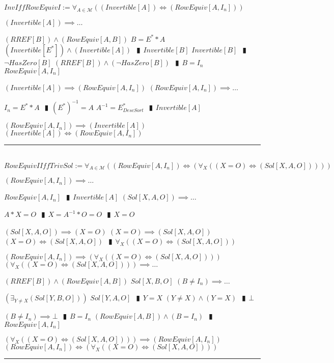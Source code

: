 \documentclass{book}
\newcommand{\abr}{:=}
\newcommand{\pipe}{$\phantom{(}\vrectangleblack\phantom{)}$}
\newcommand{\pr}[1]{\left(#1\right)}
\begin{document}
$InvIffRowEquivI \abr \forall_{A \in \mathcal{M}}\pr{(Invertible[A]) \iff (RowEquiv[A, I_n])}$
\begin{enumerate}
  \lit $(Invertible[A]) \implies \ldots$
  \begin{enumerate}
    \lit $(RREF[B]) \land (RowEquiv[A, B])$
    \lit $B = E^* * A$
    \lit $(Invertible[E^*]) \land (Invertible[A])$ \pipe $Invertible[B]$
    \lit $Invertible[B]$ \pipe $\lnot HasZero[B]$
    \lit $(RREF[B]) \land (\lnot HasZero[B])$ \pipe $B = I_n$
    \lit $RowEquiv[A, I_n]$
  \end{enumerate}
  \lit $(Invertible[A]) \implies (RowEquiv[A, I_n])$
  \lit $(RowEquiv[A, I_n]) \implies \ldots$
  \begin{enumerate}
    \lit $I_n = E^* * A$ \pipe $(E^*)^{-1} = A$
    \lit $A^{-1} = E^*_{DescSort}$ \pipe $Invertible[A]$
  \end{enumerate}
  \lit $(RowEquiv[A, I_n]) \implies (Invertible[A])$
  \lit $(Invertible[A]) \iff (RowEquiv[A, I_n])$
\end{enumerate} \vspace{.75mm} \hrule \vspace{.75mm} \ \\ %

$RowEquivIIffTrivSol \abr \forall_{A \in \mathcal{M}}\pr{(RowEquiv[A, I_n]) \iff \pr{\forall_{X}\pr{(X = O) \iff (Sol[X, A, O])}}}$
\begin{enumerate}
  \lit $(RowEquiv[A, I_n]) \implies \ldots$
  \begin{enumerate}
    \lit $RowEquiv[A, I_n]$ \pipe $Invertible[A]$
    \lit $(Sol[X, A, O]) \implies \ldots$
    \begin{enumerate}
      \lit $A * X = O$ \pipe $X = A^{-1} * O = O$ \pipe $X = O$
    \end{enumerate}
    \lit $(Sol[X, A, O]) \implies (X = O)$
    \lit $(X = O) \implies (Sol[X, A, O])$
    \lit $(X = O) \iff (Sol[X, A, O])$ \pipe $\forall_{X}\pr{(X = O) \iff (Sol[X, A, O])}$
  \end{enumerate}
  \lit $(RowEquiv[A, I_n]) \implies \pr{\forall_{X}\pr{(X = O) \iff (Sol[X, A, O])}}$
  \lit $\pr{\forall_{X}\pr{(X = O) \iff (Sol[X, A, O])}} \implies \ldots$
  \begin{enumerate}
    \lit $(RREF[B]) \land (RowEquiv[A, B])$
    \lit $Sol[X, B, O]$
    \lit $(B \neq I_n) \implies \ldots$
    \begin{enumerate}
      \lit $\pr{\exists_{Y \neq X}(Sol[Y, B, O])}$
      \lit $Sol[Y, A, O]$ \pipe $Y = X$
      \lit $(Y \neq X) \land (Y = X)$ \pipe $\bot$
    \end{enumerate}
    \lit $(B \neq I_n) \implies \bot$ \pipe $B = I_n$
    \lit $(RowEquiv[A, B]) \land (B = I_n)$ \pipe $RowEquiv[A, I_n]$
  \end{enumerate}
  \lit $\pr{\forall_{X}\pr{(X = O) \iff (Sol[X, A, O])}} \implies (RowEquiv[A, I_n])$
  \lit $(RowEquiv[A, I_n]) \iff \pr{\forall_{X}\pr{(X = O) \iff (Sol[X, A, O])}}$
\end{enumerate} \vspace{.75mm} \hrule \vspace{.75mm} \ \\ 
\end{document}
